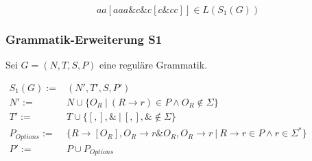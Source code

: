 \documentclass[a4paper,12pt]{report}
\begin{document}
\[ aa[aaa\&c\&c[c\&cc]]\in L(S_1(G))\]

\subsubsection*{Grammatik-Erweiterung S1}

Sei $G = (N,T,S,P)$ eine reguläre Grammatik.

$
\begin{array}{rl}
  S_1(G) :=& (N', T', S, P') \\
  N' :=& N \cup \{ O_R\ |\ (R\rightarrow r)\in P\land O_R \notin \Sigma\}\\
  T' :=& T \cup \{[ , ], \&\ |\ [,],\&\notin \Sigma \}\\
  P_{Options} :=& \{R \rightarrow [O_R], O_R \rightarrow r\& O_R, O_R \rightarrow r \ \vert\ R\rightarrow r\in P \land r\in \Sigma^*\} \\
  P' :=& P \cup P_{Options} 
\end{array}
$
\end{document}
